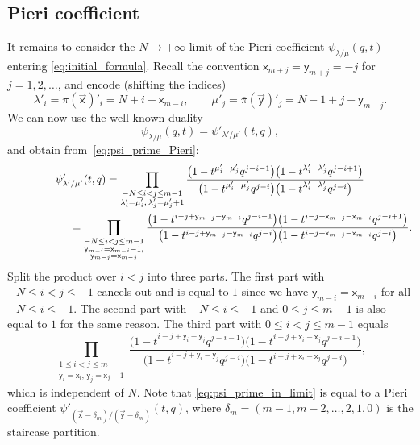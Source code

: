 \subsection{Pieri coefficient}

It remains to consider the $N\to+\infty$ limit of the Pieri
coefficient $\psi_{\lambda/\mu}(q,t)$
entering \eqref{eq:initial_formula}.
Recall the convention
$\mathsf{x}_{m+j}=\mathsf{y}_{m+j}
=-j$ for $j=1,2,\dots $,
and encode (shifting the indices)
\begin{equation*}
	\lambda'_i=\pi(\vec{\mathsf{x}})'_i=N+i-\mathsf{x}_{m-i},
	\qquad
	\mu'_j=\overline\pi(\vec{\mathsf{y}})'_j=N-1+j-\mathsf{y}_{m-j}.
\end{equation*}
We can now use
the well-known duality
\cite[proof of formula~(6.24)]{Macdonald1995}
\begin{equation*}
	\psi_{\lambda/\mu}(q,t)=
	\psi'_{\lambda'/\mu'}(t,q),
\end{equation*}
and obtain from~\eqref{eq:psi_prime_Pieri}:
\begin{gather*}
	\psi'_{\lambda'/\mu'}(t,q)
	=
	\prod_{\substack{-N\le i<j\le m-1
	\\
	\lambda'_{i}=\mu'_{i},\, \lambda'_{j}=\mu'_{j}+1}}
	\frac{\big(1-t^{\mu'_{i}-\mu'_{j}} q^{j-i-1}\big)\big(1-t^{\lambda'_{i}-\lambda'_{j}} q^{j-i+1}\big)}
	{\big(1-t^{\mu'_{i}-\mu'_{j}} q^{j-i}\big)\big(1-t^{\lambda'_{i}-\lambda'_{j}} q^{j-i}\big)}
	\\
\hphantom{\psi'_{\lambda'/\mu'}(t,q)=}{}
=
	\prod_{\substack{-N\le i<j\le m-1
	\\
	\mathsf{y}_{m-i}=\mathsf{x}_{m-i}-1,\\
	\mathsf{y}_{m-j}=\mathsf{x}_{m-j}}}
	\frac{\big(1-t^{i-j+\mathsf{y}_{m-j}-\mathsf{y}_{m-i}}
	q^{j-i-1}\big)
	\big(1-t^{i-j+\mathsf{x}_{m-j}-\mathsf{x}_{m-i}} q^{j-i+1}\big)}
	{\big(1-t^{i-j+\mathsf{y}_{m-j}-\mathsf{y}_{m-i}} q^{j-i}\big)
	\big(1-t^{i-j+\mathsf{x}_{m-j}-\mathsf{x}_{m-i}} q^{j-i}\big)}.
\end{gather*}
Split the product over $i<j$ into three parts.
The first part with $-N\le i<j\le -1$
cancels out and is equal to $1$
since
we have $\mathsf{y}_{m-i}=\mathsf{x}_{m-i}$ for all $-N\le i\le -1$.
The second part
with $-N\le i\le -1$ and $0\le j\le m-1$ is also equal to $1$ for the same reason.
The third part with $0\le i<j\le m-1$ equals
\begin{equation}
	\label{eq:psi_prime_in_limit}
	\prod_{\substack{1\le i<j\le m
	\\
	\mathsf{y}_{i}=\mathsf{x}_{i}
	,\,
	\mathsf{y}_{j}=\mathsf{x}_{j}-1}}
	\frac{\big(1-t^{i-j+\mathsf{y}_{i}-\mathsf{y}_{j}}
	q^{j-i-1}\big)
	\big(1-t^{i-j+\mathsf{x}_{i}-\mathsf{x}_{j}} q^{j-i+1}\big)}
	{\big(1-t^{i-j+\mathsf{y}_{i}-\mathsf{y}_{j}} q^{j-i}\big)
	\big(1-t^{i-j+\mathsf{x}_{i}-\mathsf{x}_{j}} q^{j-i}\big)},
\end{equation}
which is independent of $N$. Note that
\eqref{eq:psi_prime_in_limit} is equal to a Pieri coefficient
$\psi'_{(\vec{\mathsf{x}}-\delta_m)/(\vec{\mathsf{y}}-\delta_m)}(t,q)$,
where $\delta_m=(m-1,m-2,\dots,2,1,0)$ is the
staircase partition.


